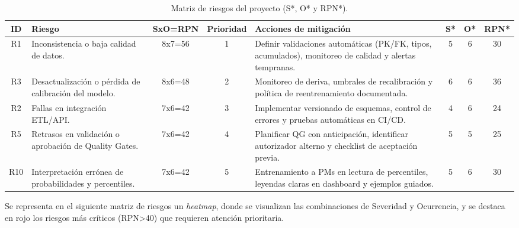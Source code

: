 \documentclass[12pt]
{charter}
\begin{document}
\begin{table}[ht]
\centering
\scriptsize
\caption{Matriz de riesgos del proyecto (S*, O* y RPN*).}
\label{tab:riesgos-RPN-residual}
\begin{tabularx}{\textwidth}{cXccXccc}
\toprule
\textbf{ID} & \textbf{Riesgo} & \textbf{SxO=RPN} & \textbf{Prioridad} & \textbf{Acciones de mitigación} & \textbf{S*} & \textbf{O*} & \textbf{RPN*}  \\
\midrule
R1 & Inconsistencia o baja calidad de datos. & 8x7=56 & 1 &
Definir validaciones automáticas (PK/FK, tipos, acumulados), monitoreo de calidad y alertas tempranas. & 5 & 6 & 30 \\
R3 & Desactualización o pérdida de calibración del modelo. & 8x6=48 & 2 &
Monitoreo de deriva, umbrales de recalibración y política de reentrenamiento documentada. & 6 & 6 & 36 \\
R2 & Fallas en integración ETL/API. & 7x6=42 & 3 & 
Implementar versionado de esquemas, control de errores y pruebas automáticas en CI/CD. & 4 & 6 & 24 \\
R5 & Retrasos en validación o aprobación de Quality Gates. & 7x6=42 & 4 &
Planificar QG con anticipación, identificar autorizador alterno y checklist de aceptación previa. & 5 & 5 & 25 \\
R10 & Interpretación errónea de probabilidades y percentiles. & 7x6=42 & 5 &
Entrenamiento a PMs en lectura de percentiles, leyendas claras en dashboard y ejemplos guiados. & 5 & 6 & 30 \\
\bottomrule
\end{tabularx}
\end{table}
\FloatBarrier

Se representa en el siguiente matriz de riesgos un \textit{heatmap}, donde se visualizan las combinaciones de Severidad y Ocurrencia, y se destaca en rojo los riesgos más críticos (RPN>40) que requieren atención prioritaria.
\end{document}
